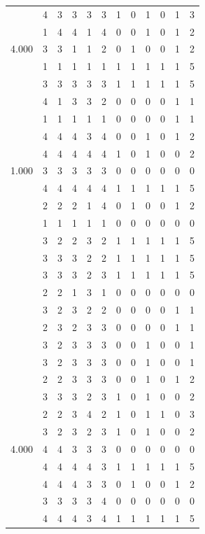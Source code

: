 \documentclass[]{book}
\theoremstyle{definition}
\theoremstyle{definition}
\theoremstyle{definition}
\theoremstyle{remark}
\begin{document}
\begin{table}
{\begin{tabular}[t]{rrrrrrrrrrrr}
 & 4 & 3 & 3 & 3 & 3 & 1 & 0 & 1 & 0 & 1 & 3\\
 & 1 & 4 & 4 & 1 & 4 & 0 & 0 & 1 & 0 & 1 & 2\\
4.000 & 3 & 3 & 1 & 1 & 2 & 0 & 1 & 0 & 0 & 1 & 2\\
 & 1 & 1 & 1 & 1 & 1 & 1 & 1 & 1 & 1 & 1 & 5\\
 & 3 & 3 & 3 & 3 & 3 & 1 & 1 & 1 & 1 & 1 & 5\\
 & 4 & 1 & 3 & 3 & 2 & 0 & 0 & 0 & 0 & 1 & 1\\
 & 1 & 1 & 1 & 1 & 1 & 0 & 0 & 0 & 0 & 1 & 1\\
 & 4 & 4 & 4 & 3 & 4 & 0 & 0 & 1 & 0 & 1 & 2\\
 & 4 & 4 & 4 & 4 & 4 & 1 & 0 & 1 & 0 & 0 & 2\\
1.000 & 3 & 3 & 3 & 3 & 3 & 0 & 0 & 0 & 0 & 0 & 0\\
 & 4 & 4 & 4 & 4 & 4 & 1 & 1 & 1 & 1 & 1 & 5\\
 & 2 & 2 & 2 & 1 & 4 & 0 & 1 & 0 & 0 & 1 & 2\\
 & 1 & 1 & 1 & 1 & 1 & 0 & 0 & 0 & 0 & 0 & 0\\
 & 3 & 2 & 2 & 3 & 2 & 1 & 1 & 1 & 1 & 1 & 5\\
 & 3 & 3 & 3 & 2 & 2 & 1 & 1 & 1 & 1 & 1 & 5\\
 & 3 & 3 & 3 & 2 & 3 & 1 & 1 & 1 & 1 & 1 & 5\\
 & 2 & 2 & 1 & 3 & 1 & 0 & 0 & 0 & 0 & 0 & 0\\
 & 3 & 2 & 3 & 2 & 2 & 0 & 0 & 0 & 0 & 1 & 1\\
 & 2 & 3 & 2 & 3 & 3 & 0 & 0 & 0 & 0 & 1 & 1\\
 & 3 & 2 & 3 & 3 & 3 & 0 & 0 & 1 & 0 & 0 & 1\\
 & 3 & 2 & 3 & 3 & 3 & 0 & 0 & 1 & 0 & 0 & 1\\
 & 2 & 2 & 3 & 3 & 3 & 0 & 0 & 1 & 0 & 1 & 2\\
 & 3 & 3 & 3 & 2 & 3 & 1 & 0 & 1 & 0 & 0 & 2\\
 & 2 & 2 & 3 & 4 & 2 & 1 & 0 & 1 & 1 & 0 & 3\\
 & 3 & 2 & 3 & 2 & 3 & 1 & 0 & 1 & 0 & 0 & 2\\
4.000 & 4 & 4 & 3 & 3 & 3 & 0 & 0 & 0 & 0 & 0 & 0\\
 & 4 & 4 & 4 & 4 & 3 & 1 & 1 & 1 & 1 & 1 & 5\\
 & 4 & 4 & 4 & 3 & 3 & 0 & 1 & 0 & 0 & 1 & 2\\
 & 3 & 3 & 3 & 3 & 4 & 0 & 0 & 0 & 0 & 0 & 0\\
 & 4 & 4 & 4 & 3 & 4 & 1 & 1 & 1 & 1 & 1 & 5\\

\end{tabular}}
\end{table}
\end{document}
